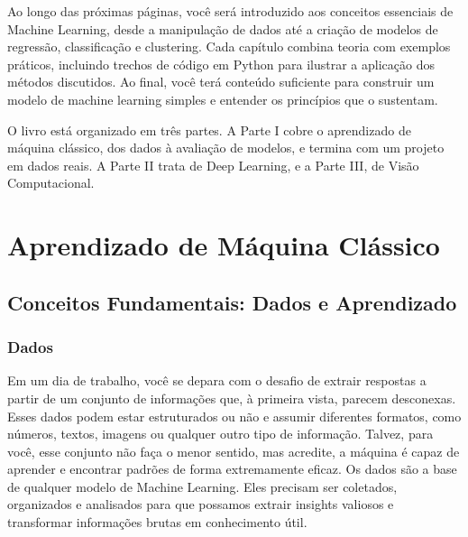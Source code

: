 \documentclass[a4paper,12pt,openany]{book}
\begin{document}
Ao longo das próximas páginas, você será introduzido aos conceitos essenciais de Machine Learning, desde a manipulação de dados até a criação de modelos de regressão, classificação e clustering. Cada capítulo combina teoria com exemplos práticos, incluindo trechos de código em Python para ilustrar a aplicação dos métodos discutidos. Ao final, você terá conteúdo suficiente para construir um modelo de machine learning simples e entender os princípios que o sustentam.

O livro está organizado em três partes. A Parte I cobre o aprendizado de máquina clássico, dos dados à avaliação de modelos, e termina com um projeto em dados reais. A Parte II trata de Deep Learning, e a Parte III, de Visão Computacional.

\part{Aprendizado de Máquina Clássico}

\chapter{Conceitos Fundamentais: Dados e Aprendizado}

\section{Dados}
Em um dia de trabalho, você se depara com o desafio de extrair respostas a partir de um conjunto de informações que, à primeira vista, parecem desconexas. Esses dados podem estar estruturados ou não e assumir diferentes formatos, como números, textos, imagens ou qualquer outro tipo de informação. Talvez, para você, esse conjunto não faça o menor sentido, mas acredite, a máquina é capaz de aprender e encontrar padrões de forma extremamente eficaz.
Os dados são a base de qualquer modelo de Machine Learning. Eles precisam ser coletados, organizados e analisados para que possamos extrair insights valiosos e transformar informações brutas em conhecimento útil.
\end{document}
